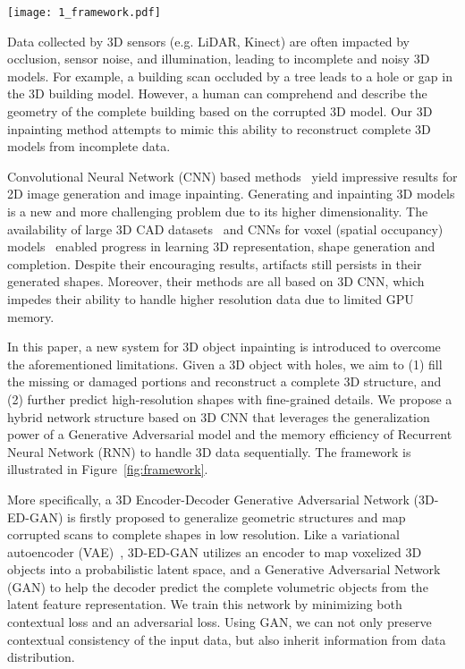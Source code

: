 \documentclass[10pt,twocolumn,letterpaper]{article}
\begin{document}
\begin{figure*}[t]
    \texttt{[image: 1\_framework.pdf]}
    \caption{Our method completes a corrupted 3D scan using a convolutional Encoder-Decoder generative adversarial network in low resolution. The outputs are then sliced into a sequence of 2D images and a recurrent convolutional network is further introduced to produce high-resolution completion prediction.   }
    \label{fig:framework}
\end{figure*}

Data collected by 3D sensors (e.g. LiDAR, Kinect) are often impacted by occlusion, sensor noise, and illumination, leading to incomplete and noisy 3D models. For example, a building scan occluded by a tree leads to a hole or gap in the 3D building model. However, a human can comprehend and describe the geometry of the complete building based on the corrupted 3D model. Our 3D inpainting method attempts to mimic this ability to reconstruct complete 3D models from incomplete data.

Convolutional Neural Network (CNN) based methods~\cite{gan,dcgan,contextencoder,neuralpatch} yield impressive results for 2D image generation and image inpainting. Generating and inpainting 3D models is a new and more challenging problem due to its higher dimensionality. The availability of large 3D CAD datasets~\cite{shapenet,modelnet} and CNNs for voxel (spatial occupancy) models~\cite{3dgan,vconvdae,3depn} enabled progress in learning 3D representation, shape generation and completion. Despite their encouraging results, artifacts still persists in their generated shapes. Moreover, their methods are all based on 3D CNN, which impedes their ability to handle higher resolution data due to limited GPU memory.

In this paper, a new system for 3D object inpainting is introduced to overcome the aforementioned limitations. Given a 3D object with holes, we aim to (1) fill the missing or damaged portions and reconstruct a complete 3D structure, and (2) further predict high-resolution shapes with fine-grained details. We propose a hybrid network structure based on 3D CNN that leverages the generalization power of a Generative Adversarial model and the memory efficiency of Recurrent Neural Network (RNN) to handle 3D data sequentially. The framework is illustrated in Figure~\ref{fig:framework}.

More specifically, a 3D Encoder-Decoder Generative Adversarial Network (3D-ED-GAN) is firstly proposed to generalize geometric structures and map corrupted scans to complete shapes in low resolution. Like a variational autoencoder (VAE)~\cite{VAE,vconvdae}, 3D-ED-GAN utilizes an encoder to map voxelized 3D objects into a probabilistic latent space, and a Generative Adversarial Network (GAN) to help the decoder predict the complete volumetric objects from the latent feature representation. We train this network by minimizing both contextual loss and an adversarial loss. Using GAN, we can not only preserve contextual consistency of the input data, but also inherit information from data distribution.
\end{document}
